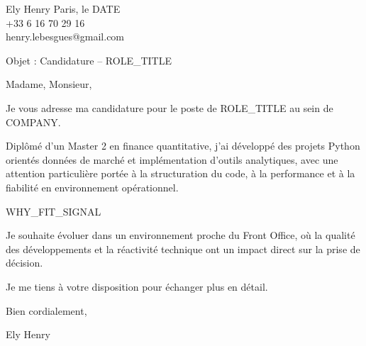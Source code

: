 \documentclass[10pt,a4paper]{article}
\begin{document}
\noindent Ely Henry \hfill Paris, le {{DATE}} \\
+33 6 16 70 29 16 \\
henry.lebesgues@gmail.com \\

\vspace{1cm}

\noindent Objet : Candidature – {{ROLE_TITLE}}

\vspace{0.5cm}

Madame, Monsieur,

\vspace{0.5cm}

Je vous adresse ma candidature pour le poste de {{ROLE_TITLE}} au sein de {{COMPANY}}.

Diplômé d’un Master 2 en finance quantitative, j’ai développé des projets Python orientés données de marché et implémentation d’outils analytiques, avec une attention particulière portée à la structuration du code, à la performance et à la fiabilité en environnement opérationnel.

{{WHY_FIT_SIGNAL}}

Je souhaite évoluer dans un environnement proche du Front Office, où la qualité des développements et la réactivité technique ont un impact direct sur la prise de décision.

Je me tiens à votre disposition pour échanger plus en détail.

Bien cordialement,

\vspace{1cm}

\noindent Ely Henry
\end{document}
